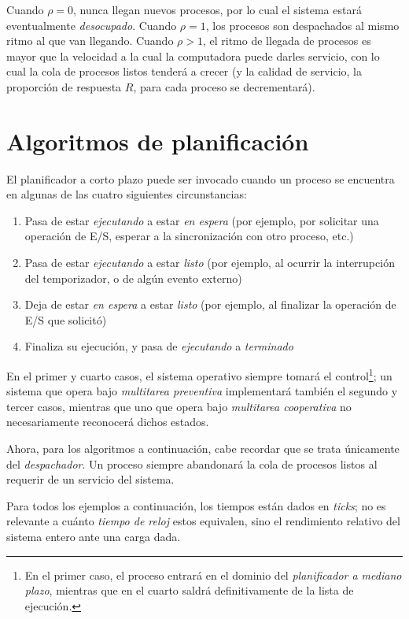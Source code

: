 \documentclass[11pt,fleqn]{book} %
\begin{document}
Cuando $\rho = 0$, nunca llegan nuevos procesos, por lo cual el
sistema estará eventualmente \emph{desocupado}. Cuando $\rho = 1$, los procesos son
despachados al mismo ritmo al que van llegando. Cuando $\rho > 1$, el
ritmo de llegada de procesos es mayor que la velocidad a la cual la
computadora puede darles servicio, con lo cual la cola de procesos
listos tenderá a crecer (y la calidad de servicio, la proporción de
respuesta $R$, para cada proceso se decrementará).
\section{Algoritmos de planificación}
\label{sec-4-2}
\label{PLAN_alg_planif}


El planificador a corto plazo puede ser invocado cuando un proceso se
encuentra en algunas de las cuatro siguientes circunstancias:

\begin{enumerate}
\item Pasa de estar \emph{ejecutando} a estar \emph{en espera} (por ejemplo, por
   solicitar una operación de E/S, esperar a la sincronización con
   otro proceso, etc.)
\item Pasa de estar \emph{ejecutando} a estar \emph{listo} (por ejemplo, al ocurrir
   la interrupción del temporizador, o de algún evento externo)
\item Deja de estar \emph{en espera} a estar \emph{listo} (por ejemplo, al
   finalizar la operación de E/S que solicitó)
\item Finaliza su ejecución, y pasa de \emph{ejecutando} a \emph{terminado}
\end{enumerate}

En el primer y cuarto casos, el sistema operativo siempre tomará el
control\footnote{En el primer caso, el proceso entrará en el dominio del
\emph{planificador a mediano plazo}, mientras que en el cuarto saldrá
definitivamente de la lista de ejecución. }; un sistema que opera bajo
\emph{multitarea preventiva} implementará también el segundo y tercer
casos, mientras que uno que opera bajo \emph{multitarea cooperativa} no
necesariamente reconocerá dichos estados.

Ahora, para los algoritmos a continuación, cabe recordar que se trata
únicamente del \emph{despachador}. Un proceso siempre abandonará la cola de
procesos listos al requerir de un servicio del sistema.

Para todos los ejemplos a continuación, los tiempos están
dados en \emph{ticks}; no es relevante a cuánto \emph{tiempo de reloj} estos
equivalen, sino el rendimiento relativo del sistema entero ante una
carga dada.
\end{document}
